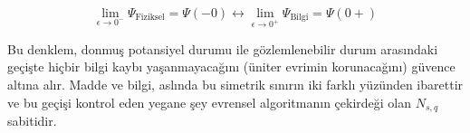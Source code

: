 \begin{equation}
\lim_{\epsilon \to 0^-} \Psi_{\text{Fiziksel}} = \Psi(-0) \longleftrightarrow \lim_{\epsilon \to 0^+} \Psi_{\text{Bilgi}} = \Psi(0+)
\end{equation}

Bu denklem, donmuş potansiyel durumu ile gözlemlenebilir durum arasındaki geçişte hiçbir bilgi kaybı yaşanmayacağını (üniter evrimin korunacağını) güvence altına alır. Madde ve bilgi, aslında bu simetrik sınırın iki farklı yüzünden ibarettir ve bu geçişi kontrol eden yegane şey evrensel algoritmanın çekirdeği olan $N_{s,q}$ sabitidir.

